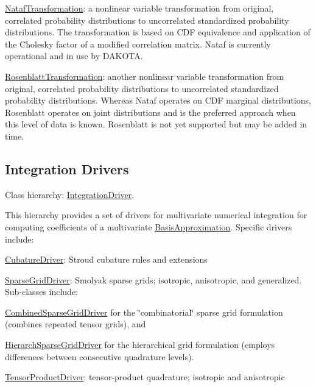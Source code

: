 \begin{DoxyItemize}
\item \hyperlink{classPecos_1_1NatafTransformation}{Nataf\+Transformation}\+: a nonlinear variable transformation from original, correlated probability distributions to uncorrelated standardized probability distributions. The transformation is based on C\+DF equivalence and application of the Cholesky factor of a modified correlation matrix. Nataf is currently operational and in use by D\+A\+K\+O\+TA.


\item \hyperlink{classPecos_1_1RosenblattTransformation}{Rosenblatt\+Transformation}\+: another nonlinear variable transformation from original, correlated probability distributions to uncorrelated standardized probability distributions. Whereas Nataf operates on C\+DF marginal distributions, Rosenblatt operates on joint distributions and is the preferred approach when this level of data is known. Rosenblatt is not yet supported but may be added in time. 
\end{DoxyItemize}\hypertarget{index_DevDrivers}{}\subsection{Integration Drivers}\label{index_DevDrivers}
Class hierarchy\+: \hyperlink{classPecos_1_1IntegrationDriver}{Integration\+Driver}.

This hierarchy provides a set of drivers for multivariate numerical integration for computing coefficients of a multivariate \hyperlink{classPecos_1_1BasisApproximation}{Basis\+Approximation}. Specific drivers include\+: 
\begin{DoxyItemize}
\item \hyperlink{classPecos_1_1CubatureDriver}{Cubature\+Driver}\+: Stroud cubature rules and extensions 
\item \hyperlink{classPecos_1_1SparseGridDriver}{Sparse\+Grid\+Driver}\+: Smolyak sparse grids; isotropic, anisotropic, and generalized. Sub-\/classes include\+: 
\begin{DoxyItemize}
\item \hyperlink{classPecos_1_1CombinedSparseGridDriver}{Combined\+Sparse\+Grid\+Driver} for the \char`\"{}combinatorial\char`\"{} sparse grid formulation (combines repeated tensor grids), and 
\item \hyperlink{classPecos_1_1HierarchSparseGridDriver}{Hierarch\+Sparse\+Grid\+Driver} for the hierarchical grid formulation (employs differences between consecutive quadrature levels). 
\end{DoxyItemize}
\item \hyperlink{classPecos_1_1TensorProductDriver}{Tensor\+Product\+Driver}\+: tensor-\/product quadrature; isotropic and anisotropic


\end{DoxyItemize}

